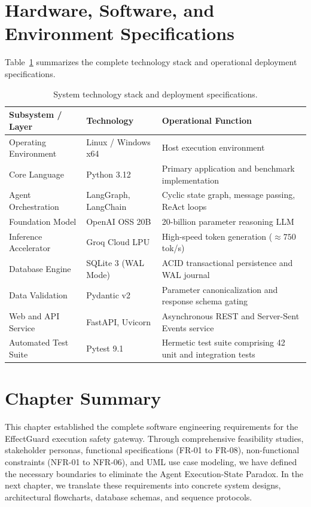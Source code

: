 \section{Hardware, Software, and Environment Specifications}

Table~\ref{tab:tech_stack} summarizes the complete technology stack and operational deployment specifications.

\begin{table}[H]
\centering
\small
\renewcommand{\arraystretch}{1.25}
\begin{tabular}{|p{3.5cm}|p{2.8cm}|p{7.2cm}|}
\hline
\rowcolor{gray!15}
\textbf{Subsystem / Layer} & \textbf{Technology} & \textbf{Operational Function} \\
\hline
Operating Environment & Linux / Windows x64 & Host execution environment \\
\hline
Core Language & Python 3.12 & Primary application and benchmark implementation \\
\hline
Agent Orchestration & LangGraph, LangChain & Cyclic state graph, message passing, ReAct loops \\
\hline
Foundation Model & OpenAI OSS 20B & 20-billion parameter reasoning LLM \\
\hline
Inference Accelerator & Groq Cloud LPU & High-speed token generation ($\approx 750$\,tok/s) \\
\hline
Database Engine & SQLite 3 (WAL Mode) & ACID transactional persistence and WAL journal \\
\hline
Data Validation & Pydantic v2 & Parameter canonicalization and response schema gating \\
\hline
Web and API Service & FastAPI, Uvicorn & Asynchronous REST and Server-Sent Events service \\
\hline
Automated Test Suite & Pytest 9.1 & Hermetic test suite comprising 42 unit and integration tests \\
\hline
\end{tabular}
\caption{System technology stack and deployment specifications.}
\label{tab:tech_stack}
\end{table}

\section{Chapter Summary}

This chapter established the complete software engineering requirements for the EffectGuard execution safety gateway. Through comprehensive feasibility studies, stakeholder personas, functional specifications (FR-01 to FR-08), non-functional constraints (NFR-01 to NFR-06), and UML use case modeling, we have defined the necessary boundaries to eliminate the Agent Execution-State Paradox. In the next chapter, we translate these requirements into concrete system designs, architectural flowcharts, database schemas, and sequence protocols.
